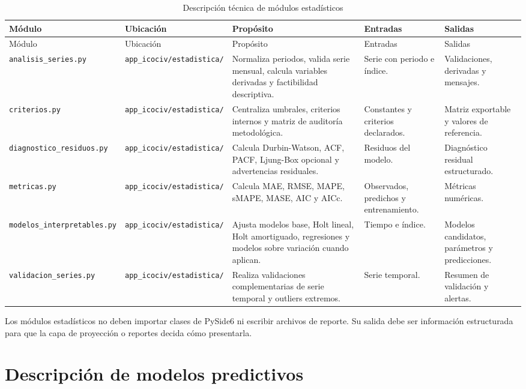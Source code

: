 \documentclass[12pt,letterpaper]{article}
\begin{document}
\begin{longtable}{p{}p{}p{}p{}p{}}
\caption{Descripción técnica de módulos estadísticos}
\label{tab:modulos_estadisticos}\\
\toprule
Módulo & Ubicación & Propósito & Entradas & Salidas \\
\midrule
\endfirsthead
\toprule
Módulo & Ubicación & Propósito & Entradas & Salidas \\
\midrule
\endhead
\texttt{analisis\_series.py} & \texttt{app\_icociv/estadistica/} & Normaliza periodos, valida serie mensual, calcula variables derivadas y factibilidad descriptiva. & Serie con periodo e índice. & Validaciones, derivadas y mensajes. \\
\texttt{criterios.py} & \texttt{app\_icociv/estadistica/} & Centraliza umbrales, criterios internos y matriz de auditoría metodológica. & Constantes y criterios declarados. & Matriz exportable y valores de referencia. \\
\texttt{diagnostico\_residuos.py} & \texttt{app\_icociv/estadistica/} & Calcula Durbin-Watson, ACF, PACF, Ljung-Box opcional y advertencias residuales. & Residuos del modelo. & Diagnóstico residual estructurado. \\
\texttt{metricas.py} & \texttt{app\_icociv/estadistica/} & Calcula MAE, RMSE, MAPE, sMAPE, MASE, AIC y AICc. & Observados, predichos y entrenamiento. & Métricas numéricas. \\
\texttt{modelos\_interpretables.py} & \texttt{app\_icociv/estadistica/} & Ajusta modelos base, Holt lineal, Holt amortiguado, regresiones y modelos sobre variación cuando aplican. & Tiempo e índice. & Modelos candidatos, parámetros y predicciones. \\
\texttt{validacion\_series.py} & \texttt{app\_icociv/estadistica/} & Realiza validaciones complementarias de serie temporal y outliers extremos. & Serie temporal. & Resumen de validación y alertas. \\
\bottomrule
\end{longtable}

Los módulos estadísticos no deben importar clases de PySide6 ni escribir archivos de reporte. Su salida debe ser información estructurada para que la capa de proyección o reportes decida cómo presentarla.

\section{Descripción de modelos predictivos}
\end{document}
